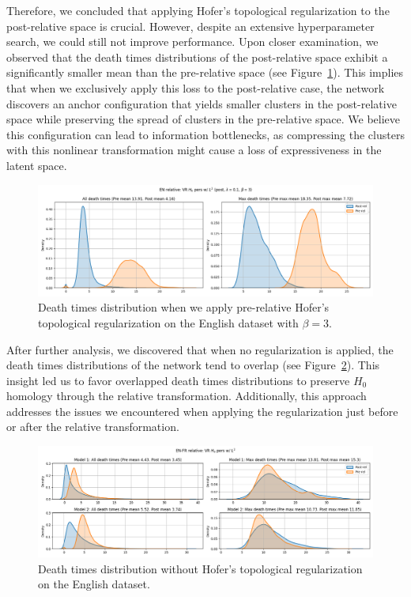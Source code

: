 \documentclass[../main.tex]{subfiles}
\begin{document}
Therefore, we concluded that applying Hofer's topological regularization to the post-relative space is crucial. However, despite an extensive hyperparameter search, we could still not improve performance. Upon closer examination, we observed that the death times distributions of the post-relative space exhibit a significantly smaller mean than the pre-relative space (see Figure~\ref{fig:distPost}). This implies that when we exclusively apply this loss to the post-relative case, the network discovers an anchor configuration that yields smaller clusters in the post-relative space while preserving the spread of clusters in the pre-relative space. We believe this configuration can lead to information bottlenecks, as compressing the clusters with this nonlinear transformation might cause a loss of expressiveness in the latent space.\\

\begin{figure}[!ht]
    \centering
    \includegraphics[width=\textwidth]{figures/rs/stitching/en_relative_post_3_seed0.png} 
    \caption{Death times distribution when we apply pre-relative Hofer's topological regularization on the English dataset with $\beta=3$.}
    \label{fig:distPost}
\end{figure}

After further analysis, we discovered that when no regularization is applied, the death times distributions of the network tend to overlap (see Figure~\ref{fig:distVanilla}). This insight led us to favor overlapped death times distributions to preserve $H_0$ homology through the relative transformation. Additionally, this approach addresses the issues we encountered when applying the regularization just before or after the relative transformation.\\

\begin{figure}[ht!]
    \centering
    \includegraphics[width=\textwidth]{figures/rs/stitching/en_fr_relative_seed1.png} 
    \caption{Death times distribution without Hofer's topological regularization on the English dataset.}
    \label{fig:distVanilla}
\end{figure}
\end{document}
